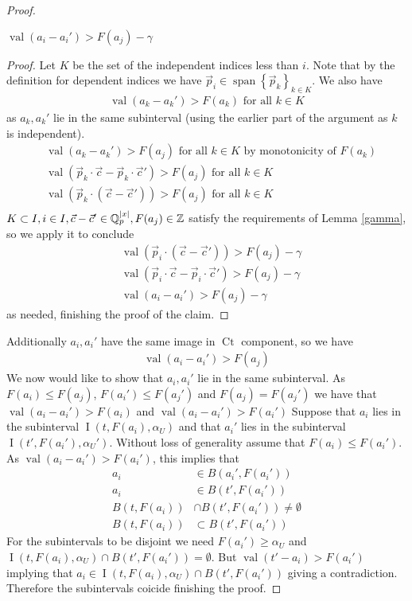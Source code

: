 \documentclass{amsart}
\newcommand{\curly}[1]{\left\{#1\right\}}
\DeclareMathOperator{\Ct}{Ct}
\DeclareMathOperator{\vecspan}{span}
\DeclareMathOperator{\val}{val}
\DeclareMathOperator{\inti}{I}
\begin{document}
\begin{proof}
  \begin{Claim}
    $\val(a_i - a_i') > F(a_j) - \gamma$
  \end{Claim}
  \begin{proof}
    Let $K$ be the set of the independent indices less than $i$.
    Note that by the definition for dependent indices we have $\vec p_i \in \vecspan \curly{\vec p_k}_{k \in K}$.
    We also have 
    \begin{align*}
      \val(a_k - a_k') > F(a_k) \text { for all } k \in K
    \end{align*}
    as $a_k, a_k'$ lie in the same subinterval (using the earlier part of the argument as $k$ is independent).
    \begin{align*}
      &\val(a_k - a_k') > F(a_j) \text { for all } k \in K \text{ by monotonicity of $F(a_k)$} \\
      &\val(\vec p_k \cdot \vec c - \vec p_k \cdot \vec c') > F(a_j) \text { for all } k \in K \\
      &\val(\vec p_k \cdot (\vec c - \vec c')) > F(a_j) \text { for all } k \in K \\
    \end{align*}
    $K \subset I, i \in I, \vec c - \vec c' \in \mathbb{Q}_p^{|x|}, F(a_j) \in \mathbb{Z}$
    satisfy the requirements of Lemma \ref {gamma}, so we apply it to conclude
    \begin{align*}
      &\val(\vec p_i \cdot (\vec c - \vec c')) > F(a_j) - \gamma \\
      &\val(\vec p_i \cdot \vec c - \vec p_i \cdot \vec c') > F(a_j) - \gamma \\
      &\val(a_i - a_i') > F(a_j) - \gamma
    \end{align*}
    as needed, finishing the proof of the claim.
  \end{proof}	
  Additionally $a_i, a_i'$ have the same image in $\Ct$ component, so we have
  \begin{align*}
    \val(a_i - a_i') > F(a_j) 
  \end{align*}
  We now would like to show that $a_i, a_i'$ lie in the same subinterval.
  As $F(a_i) \leq F(a_j)$, $F(a_i') \leq F(a_j')$ and $F(a_j) = F(a_j')$ we have that
  $\val(a_i - a_i') > F(a_i)$ and $\val(a_i - a_i') > F(a_i')$
  Suppose that $a_i$ lies in the subinterval $\inti(t, F(a_i), \alpha_U)$
  and that $a_i'$ lies in the subinterval $\inti(t', F(a_i'), \alpha_U')$.
  Without loss of generality assume that $F(a_i) \leq F(a_i')$.
  As $\val(a_i - a_i') > F(a_i')$, this implies that
  \begin{align*}
    a_i &\in B(a_i', F(a_i')) \\
    a_i &\in B(t', F(a_i')) \\
    B(t, F(a_i)) &\cap B(t', F(a_i')) \neq \emptyset \\
    B(t, F(a_i)) &\subset B(t', F(a_i')) 
  \end{align*}
  For the subintervals to be disjoint we need $F(a_i') \geq \alpha_U$ and
  $\inti(t, F(a_i), \alpha_U) \cap B(t', F(a_i')) = \emptyset$.
  But $\val(t' - a_i) > F(a_i')$ implying that $a_i \in \inti(t, F(a_i), \alpha_U) \cap B(t', F(a_i'))$ giving a contradiction.
  Therefore the subintervals coicide finishing the proof.
\end{proof}
\end{document}
